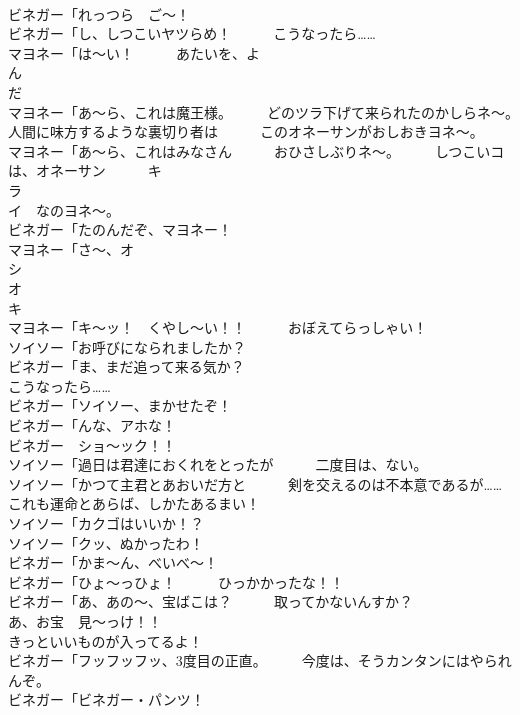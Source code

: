 \documentclass[8pt]{extreport}
\begin{document}
\begin{CJK}{UTF8}{min}
\\	ビネガー「れっつら　ご～！	
\\	ビネガー「し、しつこいヤツらめ！　　　こうなったら……	
\\	マヨネー「は～い！　　　あたいを、よ
\\	ん
\\	だ
\\	マヨネー「あ～ら、これは魔王様。　　　どのツラ下げて来られたのかしらネ～。　　　人間に味方するような裏切り者は　　　このオネーサンがおしおきヨネ～。	
\\	マヨネー「あ～ら、これはみなさん　　　おひさしぶりネ～。　　　しつこいコは、オネーサン　　　キ
\\	ラ
\\	イ　なのヨネ～。	
\\	ビネガー「たのんだぞ、マヨネー！	
\\	マヨネー「さ～、オ
\\	シ
\\	オ 
\\	キ
\\	マヨネー「キ～ッ！　くやし～い！！　　　おぼえてらっしゃい！	
\\	ソイソー「お呼びになられましたか？	
\\	ビネガー「ま、まだ追って来る気か？	
\\	こうなったら……	
\\	ビネガー「ソイソー、まかせたぞ！	
\\	ビネガー「んな、アホな！	
\\	ビネガー　ショ～ック！！	
\\	ソイソー「過日は君達におくれをとったが　　　二度目は、ない。	
\\	ソイソー「かつて主君とあおいだ方と　　　剣を交えるのは不本意であるが……　　　これも運命とあらば、しかたあるまい！	
\\	ソイソー「カクゴはいいか！？	
\\	ソイソー「クッ、ぬかったわ！	
\\	ビネガー「かま～ん、べいべ～！	
\\	ビネガー「ひょ～っひょ！　　　ひっかかったな！！	
\\	ビネガー「あ、あの～、宝ばこは？　　　取ってかないんすか？	
\\	あ、お宝　見～っけ！！	
\\	きっといいものが入ってるよ！	
\\	ビネガー「フッフッフッ、3度目の正直。　　　今度は、そうカンタンにはやられんぞ。	
\\	ビネガー「ビネガー・パンツ！	

\end{CJK}
\end{document}
